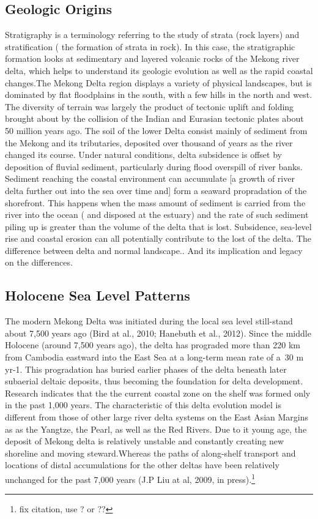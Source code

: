 \subsection{Geologic Origins}

Stratigraphy is a terminology referring to the study of strata (rock layers) and stratification ( the formation of strata in rock). In this case, the stratigraphic formation looks at sedimentary and layered volcanic rocks of the Mekong river delta, which helps to understand its geologic evolution as well as the rapid coastal changes.The Mekong Delta region displays a variety of physical landscapes, but is dominated by flat floodplains in the south, with a few hills in the north and west. The diversity of terrain was largely the product of tectonic uplift and folding brought about by the collision of the Indian and Eurasian tectonic plates about 50 million years ago. The soil of the lower Delta consist mainly of sediment from the Mekong and its tributaries, deposited over thousand of years as the river changed its course. Under natural conditions, delta subsidence is offset by deposition of fluvial sediment, particularly during flood overspill of river banks. Sediment reaching the coastal environment can accumulate [a growth of river delta further out into the sea over time and] form a seaward propradation of the shorefront. This happens when the mass amount of sediment is carried from the river into the ocean ( and disposed at the estuary) and the rate of such sediment piling up is greater than the volume of the delta that is lost. Subsidence, sea-level rise and coastal erosion can all potentially contribute to the lost of the delta. The difference between delta and normal landscape.. And its implication and legacy on the differences.
 
\subsection{Holocene Sea Level Patterns}

The modern Mekong Delta was initiated during the local sea level still-stand about 7,500 years ago (Bird at al., 2010; Hanebuth et al., 2012). Since the middle Holocene (around 7,500 years ago), the delta has prograded more than 220 km from Cambodia eastward into the East Sea at a long-term mean rate of a~30 m yr-1. This progradation has buried earlier phases of the delta beneath later subaerial deltaic deposits, thus becoming the foundation for delta development. Research indicates that the the current coastal zone on the shelf was formed only in the past 1,000 years. The characteristic of this delta evolution model is different from those of other large river delta systems on the East Asian Margins as as the Yangtze, the Pearl, as well as the Red Rivers. Due to it young age, the deposit of Mekong delta is relatively unstable and constantly creating new shoreline and moving steward.Whereas the paths of along-shelf transport and locations of distal accumulations for the other deltas have been relatively unchanged for the past 7,000 years (J.P Liu at al, 2009, in press).\footnote{fix citation, use \citet{xue2011changes}? or ??}
	
